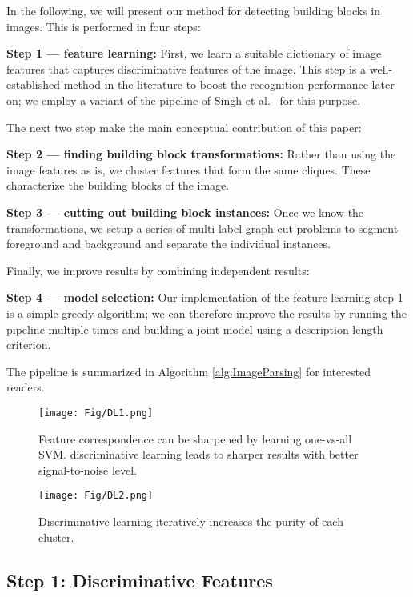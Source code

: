 \documentclass{acmtog}
\begin{document}
	
In the following, we will present our method for detecting building blocks in images. This is performed in four steps: 

\textbf{Step 1 --- feature learning:} First, we learn a suitable dictionary of image features that captures discriminative features of the image. This step is a well-established method in the literature to boost the recognition performance later on; we employ a variant of the pipeline of Singh et al.~ for this purpose.

The next two step make the main conceptual contribution of this paper: 

\textbf{Step 2 --- finding building block transformations:} Rather than using the image features as is, we cluster features that form the same cliques. These characterize the building blocks of the image.

\textbf{Step 3 --- cutting out building block instances:} Once we know the transformations, we setup a series of multi-label graph-cut problems to segment foreground and background and separate the individual instances.

Finally, we improve results by combining independent results:

\textbf{Step 4 --- model selection:} Our implementation of the feature learning step 1 is a simple greedy algorithm; we can therefore improve the results by running the pipeline multiple times and building a joint model using a description length criterion.

The pipeline is summarized in Algorithm \ref{alg:ImageParsing} for interested readers.



\begin{figure}
	\centering
		\texttt{[image: Fig/DL1.png]}
	\caption{Feature correspondence can be sharpened by learning one-vs-all SVM. discriminative learning leads to sharper results with better signal-to-noise level.}
	\label{fig:DL1}
\end{figure}

\begin{figure}
	\centering
		\texttt{[image: Fig/DL2.png]}
	\caption{Discriminative learning iteratively increases the purity of each cluster.}
	\label{fig:DL2}
\end{figure}

\subsection{Step 1: Discriminative Features}
\label{sec:IterativeDL}
\end{document}
